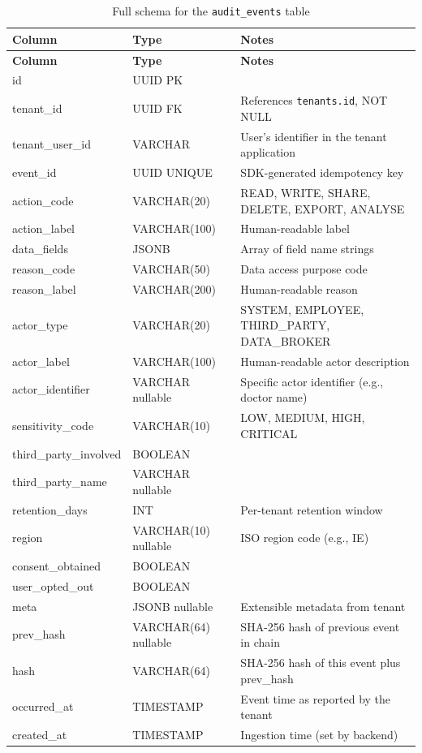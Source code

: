 \documentclass[a4paper,12pt,onecolumn]{report}
\begin{document}
\begin{longtable}{|l|l|p{6cm}|}
    \caption{Full schema for the \texttt{audit\_events} table} \label{tab:events-schema} \\
    \hline
    \textbf{Column} & \textbf{Type} & \textbf{Notes} \\
    \hline
    \endfirsthead
    \hline
    \textbf{Column} & \textbf{Type} & \textbf{Notes} \\
    \hline
    \endhead
    id & UUID PK & \\
    \hline
    tenant\_id & UUID FK & References \texttt{tenants.id}, NOT NULL \\
    \hline
    tenant\_user\_id & VARCHAR & User's identifier in the tenant application \\
    \hline
    event\_id & UUID UNIQUE & SDK-generated idempotency key \\
    \hline
    action\_code & VARCHAR(20) & READ, WRITE, SHARE, DELETE, EXPORT, ANALYSE \\
    \hline
    action\_label & VARCHAR(100) & Human-readable label \\
    \hline
    data\_fields & JSONB & Array of field name strings \\
    \hline
    reason\_code & VARCHAR(50) & Data access purpose code \\
    \hline
    reason\_label & VARCHAR(200) & Human-readable reason \\
    \hline
    actor\_type & VARCHAR(20) & SYSTEM, EMPLOYEE, THIRD\_PARTY, DATA\_BROKER \\
    \hline
    actor\_label & VARCHAR(100) & Human-readable actor description \\
    \hline
    actor\_identifier & VARCHAR nullable & Specific actor identifier (e.g., doctor name) \\
    \hline
    sensitivity\_code & VARCHAR(10) & LOW, MEDIUM, HIGH, CRITICAL \\
    \hline
    third\_party\_involved & BOOLEAN & \\
    \hline
    third\_party\_name & VARCHAR nullable & \\
    \hline
    retention\_days & INT & Per-tenant retention window \\
    \hline
    region & VARCHAR(10) nullable & ISO region code (e.g., IE) \\
    \hline
    consent\_obtained & BOOLEAN & \\
    \hline
    user\_opted\_out & BOOLEAN & \\
    \hline
    meta & JSONB nullable & Extensible metadata from tenant \\
    \hline
    prev\_hash & VARCHAR(64) nullable & SHA-256 hash of previous event in chain \\
    \hline
    hash & VARCHAR(64) & SHA-256 hash of this event plus prev\_hash \\
    \hline
    occurred\_at & TIMESTAMP & Event time as reported by the tenant \\
    \hline
    created\_at & TIMESTAMP & Ingestion time (set by backend) \\
    \hline
\end{longtable}
\end{document}
